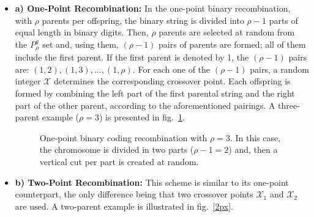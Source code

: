 \begin{itemize}
\item[]{\bf a) One-Point Recombination:} 
In the one-point binary recombination, with $\rho$ parents per offspring, the binary string is divided into $\rho \! - \! 1$ parts of equal length in binary digits. Then, $\rho$ parents are selected at random from the $P_{\mu}^{g}$ set and, using them, $(\rho \! - \! 1)$ pairs of parents are formed; all of them include the first parent. If the first parent is denoted by 1, the $(\rho \! - \! 1)$ pairs are: $(1,2),(1,3),...,(1,\rho)$. 
For each one of the $(\rho \! - \! 1)$ pairs, a random integer $\mathcal{X}$ determines the corresponding crossover point. Each offspring is formed by combining the left part of the first parental string and the right part of the other parent, according to the aforementioned pairings. A three-parent example ($\rho=3$) is presented in fig.\ \ref{1px}.
\begin{figure}[h!]
\begin{minipage}[b]{1.0\linewidth}
 \centering
\end{minipage}
\caption{One-point binary coding recombination with $\rho=3$. In this case, the chromosome is divided in two parts ($\rho-1 = 2$) and, then  a vertical cut per part is created at random.} 
\label{1px}
\end{figure}

\FloatBarrier
\item[]{\bf b) Two-Point Recombination:} This scheme is similar to its one-point counterpart, the only difference being that two crossover points $\mathcal{X}_1$ and $\mathcal{X}_2$ are used. A two-parent example is illustrated in fig.\ \ref{2px}.


\end{itemize}
